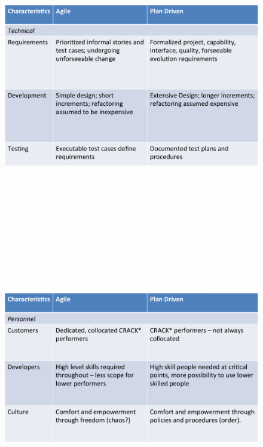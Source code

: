\documentclass[a4paper]{report}
\begin{document}
\begin{figure}[h]
\begin{center} 
    \includegraphics[scale=0.8,width = 15cm, height = 12cm]{images/AgileTable3.pdf}
\end{center}
\end{figure}

\begin{figure}[h]
\begin{center} 
    \includegraphics[scale=0.8,width = 15cm, height = 12cm]{images/AgileTable4.pdf}
\end{center}
\end{figure}
\end{document}
